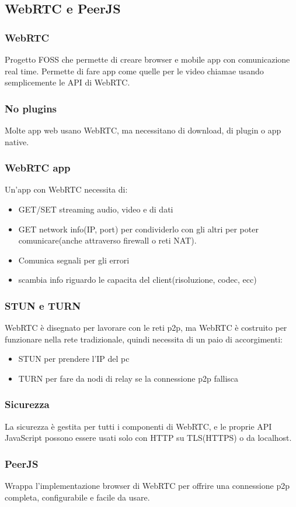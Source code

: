 \subsection{WebRTC e PeerJS}
\subsubsection{WebRTC}
Progetto FOSS che permette di creare browser e mobile app con comunicazione real time.
Permette di fare app come quelle per le video chiamae usando semplicemente le API di WebRTC.
\subsubsection{No plugins}
Molte app web usano WebRTC, ma necessitano di download, di plugin o app native.
\subsubsection{WebRTC app}
Un'app con WebRTC necessita di:
\begin{itemize}
    \item GET/SET streaming audio, video e di dati
    \item GET network info(IP, port) per condividerlo con gli altri per poter comunicare(anche attraverso firewall o reti NAT).
    \item Comunica segnali per gli errori
    \item scambia info riguardo le capacita del client(risoluzione, codec, ecc)
\end{itemize}

\subsubsection{STUN e TURN}
WebRTC è disegnato per lavorare con le reti p2p, ma WebRTC è costruito per funzionare nella rete tradizionale, quindi necessita di un paio di accorgimenti:
\begin{itemize}
    \item STUN per prendere l'IP del pc
    \item TURN per fare da nodi di relay se la connessione p2p fallisca
\end{itemize}

\subsubsection{Sicurezza}
La sicurezza è gestita per tutti i componenti di WebRTC, e le proprie API JavaScript possono essere usati solo con HTTP su TLS(HTTPS) o da localhost.
\subsubsection{PeerJS}
Wrappa l'implementazione browser di WebRTC per offrire una connessione p2p completa, configurabile e facile da usare.

